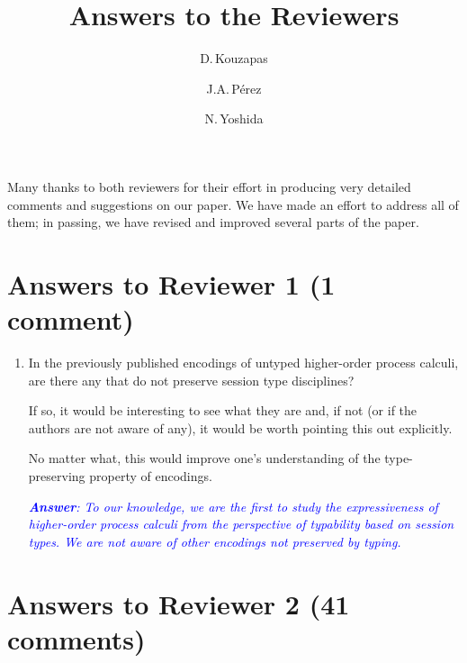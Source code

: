 \documentclass[11pt,a4paper]{article}
\newcommand{\answ}[1]{\smallskip \emph{\textcolor{blue}{\textbf{Answer}:  #1}}}
\begin{document}
 
 \title{Answers to the Reviewers}
 \author{D.\,Kouzapas \and J.A.\,P\'{e}rez \and N.\,Yoshida}
 \maketitle

\noindent
Many thanks to both reviewers for their effort in producing very detailed comments and suggestions on our paper.
We have made an effort to address all of them; in passing, we have revised and improved several parts of the paper.
 
\section{Answers to Reviewer 1 (1 comment)}


\begin{enumerate}
    \item  In the previously published encodings of untyped higher-order process calculi, are there any that do not preserve session type disciplines? 
    
    If so, it would be interesting to see what they are and, if not (or if the authors are not aware of any), it would be worth pointing this out explicitly. 
    
    No matter what, this would improve one’s understanding of the type-preserving property of encodings.
    
    \answ{To our knowledge, we are the first to study the expressiveness of higher-order process calculi from the perspective of typability based on session types. We are not aware of other encodings not preserved by typing.}
\end{enumerate}



\section{Answers to Reviewer 2 (41 comments) }
\end{document}
